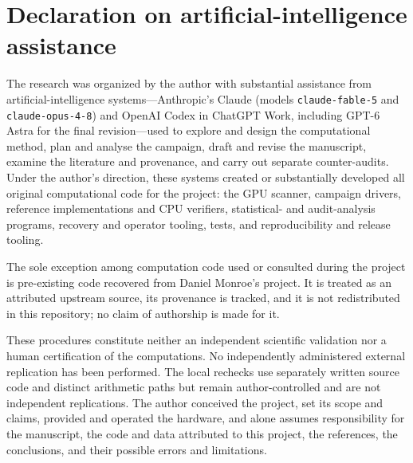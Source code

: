 \section*{Declaration on artificial-intelligence assistance}\label{s:ai}

The research was organized by the author with substantial assistance from
artificial-intelligence systems---Anthropic's Claude (models
\texttt{claude-fable-5} and \texttt{claude-opus-4-8}) and OpenAI Codex in
ChatGPT Work, including GPT-6 Astra for the final revision---used to explore and design the computational method, plan and
analyse the campaign, draft and revise the manuscript, examine the literature
and provenance, and carry out separate counter-audits.  Under the author's
direction, these systems created or substantially developed all original
computational code for the project: the GPU scanner, campaign drivers,
reference implementations and CPU verifiers, statistical- and audit-analysis
programs, recovery and operator tooling, tests, and reproducibility and release
tooling.

The sole exception among computation code used or consulted during the project
is pre-existing code recovered from Daniel Monroe's project.  It is treated as
an attributed upstream source, its provenance is tracked, and it is not
redistributed in this repository; no claim of authorship is made for it.

These procedures constitute neither an independent scientific validation nor
a human certification of the computations.  No independently administered
external replication has been performed.  The local rechecks use separately
written source code and distinct arithmetic paths but remain author-controlled
and are not independent replications.  The author conceived the project, set
its scope and claims, provided and operated the hardware, and alone assumes
responsibility
for the manuscript, the code and data attributed to this project, the
references, the conclusions, and their possible errors and limitations.
